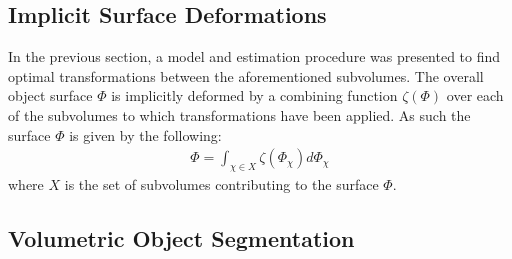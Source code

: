 \subsection{Implicit Surface Deformations}

In the previous section, a model and estimation procedure was presented to find optimal transformations between the aforementioned subvolumes.
The overall object surface $\Phi$ is implicitly deformed by a combining function $\zeta(\Phi)$ over each of the subvolumes to which transformations have been applied.
As such the surface $\Phi$ is given by the following:
\begin{equation}
\begin{split}
\Phi = \int_{\chi \in X} \zeta(\Phi_{\chi}) d \Phi_{\chi}
\end{split}
\end{equation}
where $X$ is the set of subvolumes contributing to the surface $\Phi$.

\subsection{Volumetric Object Segmentation}
\label{subsec:shapeoptimisation}

